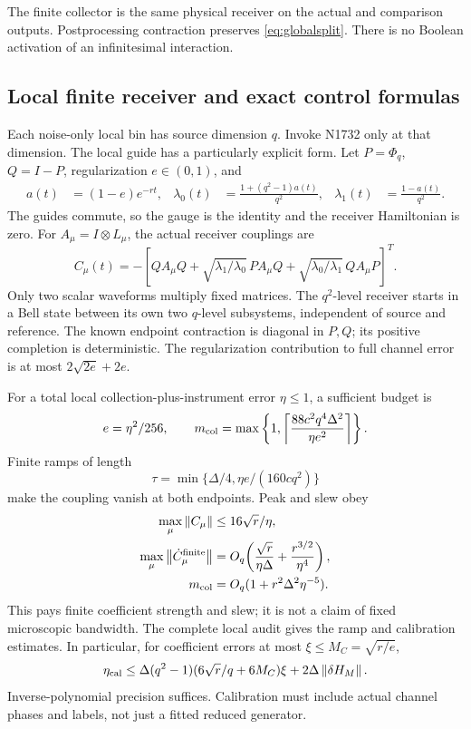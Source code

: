 \documentclass[11pt,a4paper]{article}
\newcommand{\norm}[1]{\left\lVert #1\right\rVert}\newcommand{\ket}[1]{\lvert #1\rangle}\newcommand{\bra}[1]{\langle #1\rvert}
\begin{document}
The finite collector is the same physical receiver on the actual and comparison outputs. Postprocessing contraction preserves \eqref{eq:globalsplit}. There is no Boolean activation of an infinitesimal interaction.

\subsection{Local finite receiver and exact control formulas}

Each noise-only local bin has source dimension $q$. Invoke N1732 only at that dimension. The local guide has a particularly explicit form. Let $P=\Phi_q$, $Q=I-P$, regularization $e\in(0,1)$, and
\begin{align}
a(t)&=(1-e)e^{-rt},&
\lambda_0(t)&=\frac{1+(q^2-1)a(t)}{q^2},&
\lambda_1(t)&=\frac{1-a(t)}{q^2}.
\end{align}
The guides commute, so the gauge is the identity and the receiver Hamiltonian is zero. For $A_\mu=I\otimes L_\mu$, the actual receiver couplings are
\begin{equation}
C_\mu(t)=-\left[
QA_\mu Q+
\sqrt{\lambda_1/\lambda_0}\,PA_\mu Q+
\sqrt{\lambda_0/\lambda_1}\,QA_\mu P
\right]^T.
\end{equation}
Only two scalar waveforms multiply fixed matrices. The $q^2$-level receiver starts in a Bell state between its own two $q$-level subsystems, independent of source and reference. The known endpoint contraction is diagonal in $P,Q$; its positive completion is deterministic. The regularization contribution to full channel error is at most $2\sqrt{2e}+2e$.

For a total local collection-plus-instrument error $\eta\le1$, a sufficient budget is
\begin{equation}
e=\eta^2/256,\qquad
m_{\rm col}=\max\left\{1,\left\lceil\frac{88c^2q^4\Delta^2}{\eta e^2}\right\rceil\right\}.
\end{equation}
Finite ramps of length
\begin{equation}
\tau=\min\{\Delta/4,\eta e/(160cq^2)\}
\end{equation}
make the coupling vanish at both endpoints. Peak and slew obey
\begin{align}
\max_\mu\norm{C_\mu}&\le16\sqrt r/\eta,\\
\max_\mu\norm{\dot C_\mu^{\rm finite}}&=
O_q\!\left(\frac{\sqrt r}{\eta\Delta}+\frac{r^{3/2}}{\eta^4}\right),\\
m_{\rm col}&=O_q(1+r^2\Delta^2\eta^{-5}).
\end{align}
This pays finite coefficient strength and slew; it is not a claim of fixed microscopic bandwidth. The complete local audit gives the ramp and calibration estimates. In particular, for coefficient errors at most $\xi\le M_C=\sqrt{r/e}$,
\begin{equation}
\eta_{\rm cal}\le
\Delta(q^2-1)(6\sqrt r/q+6M_C)\xi
+2\Delta\norm{\delta H_M}.
\end{equation}
Inverse-polynomial precision suffices. Calibration must include actual channel phases and labels, not just a fitted reduced generator.
\end{document}
